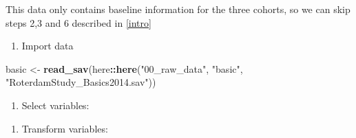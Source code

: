 \documentclass[]{book}
\newenvironment{Shaded}{\begin{snugshade}}{\end{snugshade}}
\newcommand{\DataTypeTok}[1]{\textcolor[rgb]{0.13,0.29,0.53}{#1}}
\newcommand{\DecValTok}[1]{\textcolor[rgb]{0.00,0.00,0.81}{#1}}
\newcommand{\KeywordTok}[1]{\textcolor[rgb]{0.13,0.29,0.53}{\textbf{#1}}}
\newcommand{\NormalTok}[1]{#1}
\newcommand{\OperatorTok}[1]{\textcolor[rgb]{0.81,0.36,0.00}{\textbf{#1}}}
\newcommand{\StringTok}[1]{\textcolor[rgb]{0.31,0.60,0.02}{#1}}
\providecommand{\tightlist}{%
  \setlength{\itemsep}{0pt}\setlength{\parskip}{0pt}}
\begin{document}
This data only contains baseline information for the three cohorts, so we can skip steps 2,3 and 6 described in \ref{intro}

\begin{enumerate}
\def\labelenumi{\arabic{enumi}.}
\tightlist
\item
  Import data
\end{enumerate}

\begin{Shaded}
\begin{Highlighting}[]
\NormalTok{basic <-}\StringTok{ }\KeywordTok{read_sav}\NormalTok{(here}\OperatorTok{::}\KeywordTok{here}\NormalTok{(}\StringTok{"00_raw_data"}\NormalTok{, }\StringTok{"basic"}\NormalTok{, }\StringTok{"RoterdamStudy_Basics2014.sav"}\NormalTok{))}
\end{Highlighting}
\end{Shaded}

\begin{enumerate}
\def\labelenumi{\arabic{enumi}.}
\setcounter{enumi}{1}
\tightlist
\item
  Select variables:
\end{enumerate}

\begin{Shaded}
\end{Shaded}

\begin{enumerate}
\def\labelenumi{\arabic{enumi}.}
\setcounter{enumi}{2}
\tightlist
\item
  Transform variables:
\end{enumerate}

\begin{Shaded}
\end{Shaded}
\end{document}
